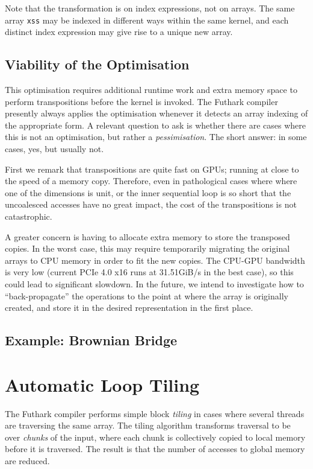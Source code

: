 Note that the transformation is on index expressions, not on arrays.
The same array \lstinline{xss} may be indexed in different ways within
the same kernel, and each distinct index expression may give rise to a
unique new  array.

\subsection{Viability of the Optimisation}

This optimisation requires additional runtime work and extra memory
space to perform transpositions before the kernel is invoked.  The
Futhark compiler presently always applies the optimisation whenever it
detects an array indexing of the appropriate form.  A relevant
question to ask is whether there are cases where this is not an
optimisation, but rather a \textit{pessimisation}.  The short answer:
in some cases, yes, but usually not.

First we remark that transpositions are quite fast on GPUs; running at
close to the speed of a memory copy.  Therefore, even in pathological
cases where where one of the dimensions is unit, or the inner
sequential loop is so short that the uncoalesced accesses have no
great impact, the cost of the transpositions is not catastrophic.

A greater concern is having to allocate extra memory to store the
transposed copies.  In the worst case, this may require temporarily
migrating the original arrays to CPU memory in order to fit the new
copies.  The CPU-GPU bandwidth is very low (current PCIe 4.0 x16 runs
at 31.51GiB/s in the best case), so this could lead to significant
slowdown.  In the future, we intend to investigate how to
``back-propagate'' the  operations to the point at where
the array is originally created, and store it in the desired
representation in the first place.

\subsection{Example: Brownian Bridge}

\section{Automatic Loop Tiling}
\label{sec:automatic-tiling}

The Futhark compiler performs simple block \textit{tiling} in cases
where several threads are traversing the same array.  The tiling
algorithm transforms traversal to be over \textit{chunks} of the
input, where each chunk is collectively copied to local memory before
it is traversed.  The result is that the number of accesses to global
memory are reduced.

